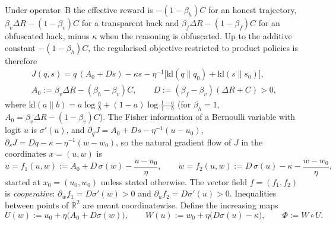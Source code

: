 Under operator~B the effective reward is $-(1-\beta_h)C$ for an honest
trajectory, $\beta_v\Delta R-(1-\beta_v)C$ for a transparent hack and
$\beta_f\Delta R-(1-\beta_f)C$ for an obfuscated hack, minus $\kappa$ when
the reasoning is obfuscated. Up to the additive constant $-(1-\beta_h)C$,
the regularised objective restricted to product policies is therefore
\begin{equation}\label{eq:two-channel-J}
\begin{gathered}
J(q,s)=q\,(A_0+Ds)-\kappa s-\eta^{-1}\bigl[\mathrm{kl}(q\|q_0)+\mathrm{kl}(s\|s_0)\bigr],\\
A_0:=\beta_v\Delta R-(\beta_h-\beta_v)C,\qquad
D:=(\beta_f-\beta_v)(\Delta R+C)>0,
\end{gathered}
\end{equation}
where $\mathrm{kl}(a\|b)=a\log\frac ab+(1-a)\log\frac{1-a}{1-b}$ (for
$\beta_h=1$, $A_0=\beta_v\Delta R-(1-\beta_v)C$). The Fisher information of
a Bernoulli variable with logit $u$ is $\sigma'(u)$, and
$\partial_qJ=A_0+Ds-\eta^{-1}(u-u_0)$,
$\partial_sJ=Dq-\kappa-\eta^{-1}(w-w_0)$, so the natural gradient flow of
$J$ in the coordinates $x=(u,w)$ is
\begin{equation}\label{eq:two-channel-flow}
\dot u=f_1(u,w):=A_0+D\,\sigma(w)-\frac{u-u_0}{\eta},\qquad
\dot w=f_2(u,w):=D\,\sigma(u)-\kappa-\frac{w-w_0}{\eta},
\end{equation}
started at $x_0=(u_0,w_0)$ unless stated otherwise. The vector field
$f=(f_1,f_2)$ is \emph{cooperative}: $\partial_wf_1=D\sigma'(w)>0$ and
$\partial_uf_2=D\sigma'(u)>0$. Inequalities between points of
$\mathbb R^2$ are meant coordinatewise. Define the increasing maps
\[
U(w):=u_0+\eta\bigl(A_0+D\sigma(w)\bigr),\qquad
W(u):=w_0+\eta\bigl(D\sigma(u)-\kappa\bigr),\qquad
\Phi:=W\circ U .
\]

